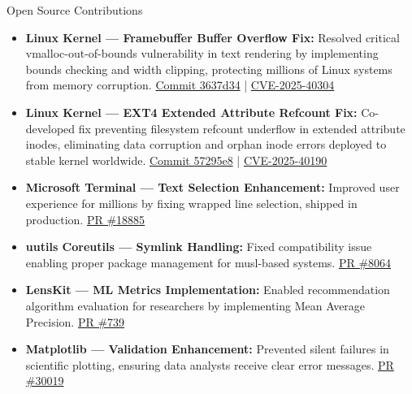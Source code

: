 \documentclass{resume} %
\begin{document}
\begin{rSection}{Open Source Contributions}
\begin{itemize}[left=0pt,itemsep=0pt]
  \item \textbf{Linux Kernel — Framebuffer Buffer Overflow Fix:} Resolved critical vmalloc-out-of-bounds vulnerability in text rendering by implementing bounds checking and width clipping, protecting millions of Linux systems from memory corruption. \href{https://git.kernel.org/pub/scm/linux/kernel/git/torvalds/linux.git/commit/?id=3637d34b35b287ab830e66048841ace404382b67}{Commit 3637d34} | \href{https://nvd.nist.gov/vuln/detail/CVE-2025-40304}{CVE-2025-40304}
  \item \textbf{Linux Kernel — EXT4 Extended Attribute Refcount Fix:} Co-developed fix preventing filesystem refcount underflow in extended attribute inodes, eliminating data corruption and orphan inode errors deployed to stable kernel worldwide. \href{https://git.kernel.org/pub/scm/linux/kernel/git/torvalds/linux.git/commit/?id=57295e835408d8d425bef58da5253465db3d6888}{Commit 57295e8} | \href{https://nvd.nist.gov/vuln/detail/CVE-2025-40190}{CVE-2025-40190}  \item \textbf{Microsoft Terminal — Text Selection Enhancement:} Improved user experience for millions by fixing wrapped line selection, shipped in production. \href{https://github.com/microsoft/terminal/pull/18885}{PR \#18885}
  \item \textbf{uutils Coreutils — Symlink Handling:} Fixed compatibility issue enabling proper package management for musl-based systems. \href{https://github.com/uutils/coreutils/pull/8064}{PR \#8064}
  \item \textbf{LensKit — ML Metrics Implementation:} Enabled recommendation algorithm evaluation for researchers by implementing Mean Average Precision. \href{https://github.com/lenskit/lkpy/pull/739}{PR \#739}
  \item \textbf{Matplotlib — Validation Enhancement:} Prevented silent failures in scientific plotting, ensuring data analysts receive clear error messages. \href{https://github.com/matplotlib/matplotlib/pull/30019}{PR \#30019}
\end{itemize}
\end{rSection}
\end{document}
